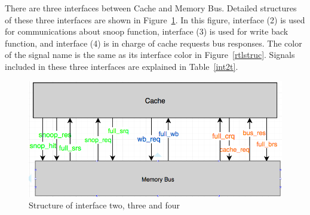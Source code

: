 \documentclass[12pt,frontmatter,copyright,thesis]{usfmanus}
\begin{document}
There are three interfaces between Cache and Memory Bus. Detailed
structures of these three interfaces are shown in Figure~\ref{int2}.
In this figure, interface (2) is used for
communications about snoop function,
interface (3) is used for write back function, and
interface (4) is in charge of cache requests bus responses.
The color of the signal name is the same as its interface color in Figure~\ref{rtlstruc}.
 Signals included in these three interfaces are
explained in Table~\ref{int2t}.
\begin{figure}[h]
\centering
    \includegraphics[width=5in]{int2.png}
    \caption{Structure of interface two, three and four}
    \label{int2}
 \end{figure}
\end{document}
